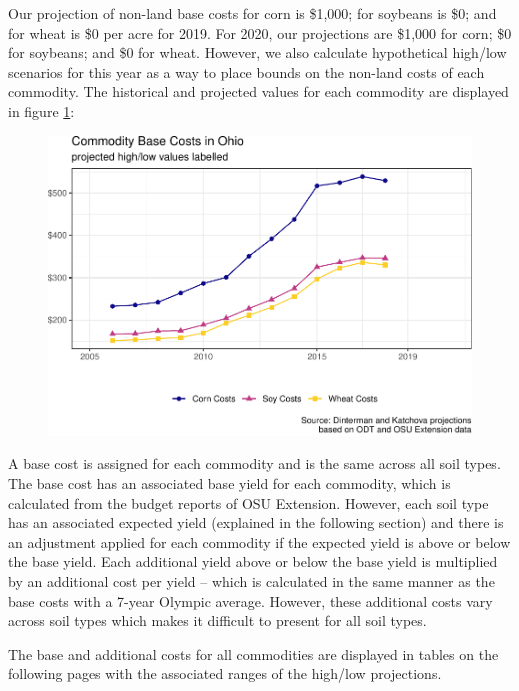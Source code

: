 \documentclass[]{article}
\begin{document}
Our projection of non-land base costs for corn is \$1,000; for soybeans
is \$0; and for wheat is \$0 per acre for 2019. For 2020, our
projections are \$1,000 for corn; \$0 for soybeans; and \$0 for wheat.
However, we also calculate hypothetical high/low scenarios for this year
as a way to place bounds on the non-land costs of each commodity. The
historical and projected values for each commodity are displayed in
figure \ref{fig:viz-nonland}:

\begin{figure}[H]
\includegraphics[width=1\linewidth]{4-projections-2019-2020_files/figure-latex/viz-nonland-1} \caption{\label{fig:viz-nonland}}\label{fig:viz-nonland}
\end{figure}

A base cost is assigned for each commodity and is the same across all
soil types. The base cost has an associated base yield for each
commodity, which is calculated from the budget reports of OSU Extension.
However, each soil type has an associated expected yield (explained in
the following section) and there is an adjustment applied for each
commodity if the expected yield is above or below the base yield. Each
additional yield above or below the base yield is multiplied by an
additional cost per yield -- which is calculated in the same manner as
the base costs with a 7-year Olympic average. However, these additional
costs vary across soil types which makes it difficult to present for all
soil types.

The base and additional costs for all commodities are displayed in
tables on the following pages with the associated ranges of the high/low
projections.
\end{document}
